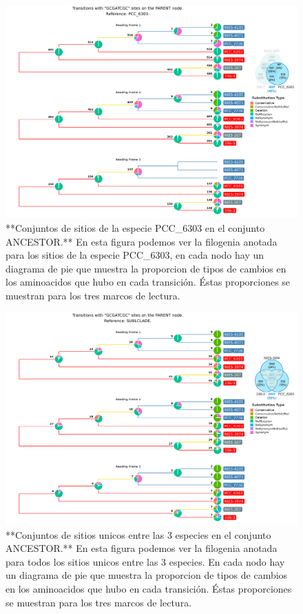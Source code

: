 \documentclass[
]{book}
\begin{document}
\begin{figure}

{\centering \includegraphics[width=1.2\linewidth]{Clados/Calothrix_B/figures/A/GCGATCGC/Ancestor/PCC_6303_Ancestral_A_tree} 

}

\caption{**Conjuntos de sitios de la especie PCC\_6303 en el conjunto ANCESTOR.** En esta figura podemos ver la filogenia anotada para los sitios de la especie PCC\_6303, en cada nodo hay un diagrama de pie que muestra la proporcion de tipos de cambios en los aminoacidos que hubo en cada transición. Éstas proporciones se muestran para los tres marcos de lectura.}\label{fig:FIG7x}
\end{figure}

\begin{figure}

{\centering \includegraphics[width=1.2\linewidth]{Clados/Calothrix_B/figures/A/GCGATCGC/Ancestor/SUBCLADE_Ancestor_A_tree} 

}

\caption{**Conjuntos de sitios unicos entre las 3 especies en el conjunto ANCESTOR.** En esta figura podemos ver la filogenia anotada para todos los sitios unicos entre las 3 especies. En cada nodo hay un diagrama de pie que muestra la proporcion de tipos de cambios en los aminoacidos que hubo en cada transición. Éstas proporciones se muestran para los tres marcos de lectura.}\label{fig:FIG8x}
\end{figure}
\end{document}
